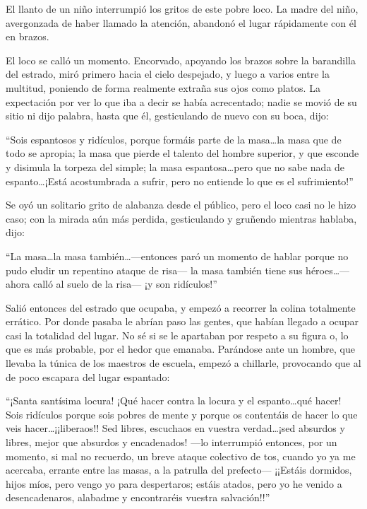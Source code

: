\documentclass[11pt,openany]{book}
\begin{document}
El llanto de un niño interrumpió los gritos de este pobre loco. La madre del niño, avergonzada de haber llamado la atención, abandonó el lugar rápidamente con él en brazos.  

El loco se calló un momento. Encorvado, apoyando los brazos sobre la barandilla del estrado, miró primero hacia el cielo despejado, y luego a varios entre la multitud, poniendo de forma realmente extraña sus ojos como platos. La expectación por ver lo que iba a decir se había acrecentado; nadie se movió de su sitio ni dijo palabra, hasta que él, gesticulando de nuevo con su boca, dijo: 

“Sois espantosos y ridículos, porque formáis parte de la masa\dots la masa que de todo se apropia; la masa que pierde el talento del hombre superior, y que esconde y disimula la torpeza del simple; la masa espantosa\dots pero que no sabe nada de espanto\dots ¡Está acostumbrada a sufrir, pero no entiende lo que es el sufrimiento!” 

Se oyó un solitario grito de alabanza desde el público, pero el loco casi no le hizo caso; con la mirada aún más perdida, gesticulando y gruñendo mientras hablaba, dijo: 

“La masa\dots la masa también\dots —entonces paró un momento de hablar porque no pudo eludir un repentino ataque de risa— la masa también tiene sus héroes\dots —ahora calló al suelo de la risa— ¡y son ridículos!” 

Salió entonces del estrado que ocupaba, y empezó a recorrer la colina totalmente errático. Por donde pasaba le abrían paso las gentes, que habían llegado a ocupar casi la totalidad del lugar. No sé si se le apartaban por respeto a su figura o, lo que es más probable, por el hedor que emanaba. Parándose ante un hombre, que llevaba la túnica de los maestros de escuela, empezó a chillarle, provocando que al de poco escapara del lugar espantado: 

“¡Santa santísima locura! ¡Qué hacer contra la locura y el espanto\dots qué hacer! Sois ridículos porque sois pobres de mente y porque os contentáis de hacer lo que veis hacer\dots ¡¡liberaos!! Sed libres, escuchaos en vuestra verdad\dots¡sed absurdos y libres, mejor que absurdos y encadenados! —lo interrumpió entonces, por un momento, si mal no recuerdo, un breve ataque colectivo de tos, cuando yo ya me acercaba, errante entre las masas, a la patrulla del prefecto— ¡¡Estáis dormidos, hijos míos, pero vengo yo para despertaros; estáis atados, pero yo he venido a desencadenaros, alabadme y encontraréis vuestra salvación!!” 
\end{document}
